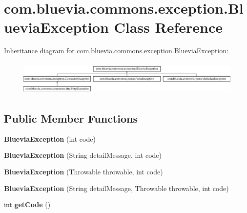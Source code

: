 \hypertarget{classcom_1_1bluevia_1_1commons_1_1exception_1_1BlueviaException}{
\section{com.bluevia.commons.exception.BlueviaException Class Reference}
\label{classcom_1_1bluevia_1_1commons_1_1exception_1_1BlueviaException}
}
Inheritance diagram for com.bluevia.commons.exception.BlueviaException:\begin{figure}[H]
\begin{center}
\leavevmode
\includegraphics[height=1.750000cm]{classcom_1_1bluevia_1_1commons_1_1exception_1_1BlueviaException}
\end{center}
\end{figure}
\subsection*{Public Member Functions}
\begin{DoxyCompactItemize}
\item 
\hypertarget{classcom_1_1bluevia_1_1commons_1_1exception_1_1BlueviaException_a9a5cb693c482b49f04320f79f3c4f11c}{
{\bfseries BlueviaException} (int code)}
\label{classcom_1_1bluevia_1_1commons_1_1exception_1_1BlueviaException_a9a5cb693c482b49f04320f79f3c4f11c}

\item 
\hypertarget{classcom_1_1bluevia_1_1commons_1_1exception_1_1BlueviaException_a75fa2bb3c7cd7ffd875193000a5fcf34}{
{\bfseries BlueviaException} (String detailMessage, int code)}
\label{classcom_1_1bluevia_1_1commons_1_1exception_1_1BlueviaException_a75fa2bb3c7cd7ffd875193000a5fcf34}

\item 
\hypertarget{classcom_1_1bluevia_1_1commons_1_1exception_1_1BlueviaException_a79c5510156ebd7312dfdbbdca531993e}{
{\bfseries BlueviaException} (Throwable throwable, int code)}
\label{classcom_1_1bluevia_1_1commons_1_1exception_1_1BlueviaException_a79c5510156ebd7312dfdbbdca531993e}

\item 
\hypertarget{classcom_1_1bluevia_1_1commons_1_1exception_1_1BlueviaException_ada79074ead5d1f95b0f981d82ec20af7}{
{\bfseries BlueviaException} (String detailMessage, Throwable throwable, int code)}
\label{classcom_1_1bluevia_1_1commons_1_1exception_1_1BlueviaException_ada79074ead5d1f95b0f981d82ec20af7}

\item 
\hypertarget{classcom_1_1bluevia_1_1commons_1_1exception_1_1BlueviaException_ac35a966d0ad1f14b32e572213b4ace6f}{
int {\bfseries getCode} ()}
\label{classcom_1_1bluevia_1_1commons_1_1exception_1_1BlueviaException_ac35a966d0ad1f14b32e572213b4ace6f}

\end{DoxyCompactItemize}
